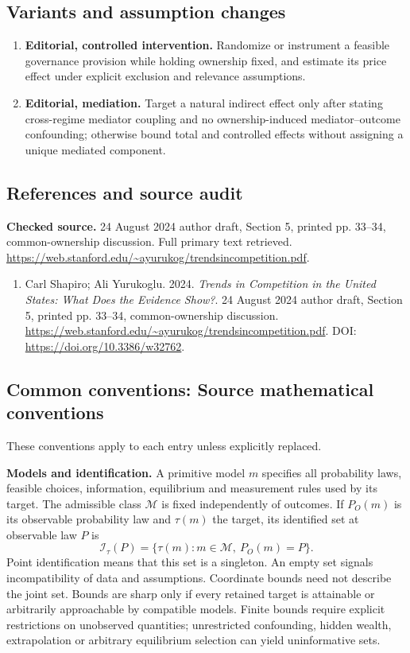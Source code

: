 \documentclass[11pt,a4paper]{article}
\begin{document}
\subsection*{Variants and assumption changes}
\begin{enumerate}
\item \textbf{Editorial, controlled intervention.} Randomize or instrument a feasible governance provision while holding ownership fixed, and estimate its price effect under explicit exclusion and relevance assumptions.
\item \textbf{Editorial, mediation.} Target a natural indirect effect only after stating cross-regime mediator coupling and no ownership-induced mediator--outcome confounding; otherwise bound total and controlled effects without assigning a unique mediated component.
\end{enumerate}
\subsection*{References and source audit}
\textbf{Checked source.} 24 August 2024 author draft, Section 5, printed pp. 33--34, common-ownership discussion. Full primary text retrieved. \url{https://web.stanford.edu/~ayurukog/trendsincompetition.pdf}.
\begin{enumerate}\raggedright
\item\hypertarget{definitions:source:30007679:1}{} Carl Shapiro; Ali Yurukoglu. 2024. \emph{Trends in Competition in the United States: What Does the Evidence Show?}. 24 August 2024 author draft, Section 5, printed pp. 33--34, common-ownership discussion.
\url{https://web.stanford.edu/~ayurukog/trendsincompetition.pdf}.
DOI: \url{https://doi.org/10.3386/w32762}.
\end{enumerate}

\subsection*{Common conventions: Source mathematical conventions}

These conventions apply to each entry unless explicitly replaced.

\textbf{Models and identification.} A primitive model \(m\) specifies all probability laws, feasible choices, information, equilibrium and measurement rules used by its target. The admissible class \(\mathcal M\) is fixed independently of outcomes. If \(P_O(m)\) is its observable probability law and \(\tau(m)\) the target, its identified set at observable law \(P\) is
\[
 \mathcal I_\tau(P)=\{\tau(m):m\in\mathcal M,\ P_O(m)=P\}.
\]
Point identification means that this set is a singleton. An empty set signals incompatibility of data and assumptions. Coordinate bounds need not describe the joint set. Bounds are sharp only if every retained target is attainable or arbitrarily approachable by compatible models. Finite bounds require explicit restrictions on unobserved quantities; unrestricted confounding, hidden wealth, extrapolation or arbitrary equilibrium selection can yield uninformative sets.
\end{document}

